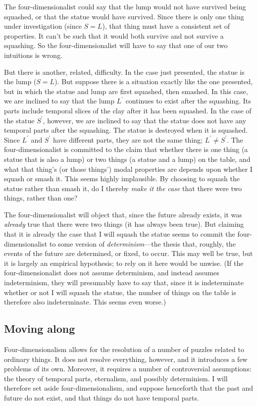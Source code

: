 \documentclass[11pt]{article}
\begin{document}
\begin{spacing}{1.5}
The four-dimensionalist could say that the lump would not have
survived being squashed, or that the statue would have survived.
Since there is only one thing under investigation (since $S = L$),
that thing must have a consistent set of properties.  It can't be such
that it would both survive and not survive a squashing.  So the
four-dimensionalist will have to say that one of our two intuitions is
wrong.

But there is another, related, difficulty.  In the case just
presented, the statue is the lump ($S = L$).  But suppose there is a
situation exactly like the one presented, but in which the statue and
lump are first squashed, then smashed.  In this case, we are inclined
to say that the lump $L^{\prime}$ continues to exist after the
squashing.  Its parts include temporal slices of the clay after it has
been squashed.  In the case of the statue $S^{\prime}$, however, we
are inclined to say that the statue does not have any temporal parts
after the squashing.  The statue is destroyed when it is squashed.
Since $L^{\prime}$ and $S^{\prime}$ have different parts, they are not
the same thing; $L^{\prime} \neq S^{\prime}$.  The four-dimensionalist
is committed to the claim that whether there is one thing (a statue
that is also a lump) or two things (a statue and a lump) on the table,
and what that thing's (or those things') modal properties are depends
upon whether I squash or smash it.  This seems highly implausible.  By
choosing to squash the statue rather than smash it, do I thereby {\em
  make it the case} that there were two things, rather than one?

The four-dimensionalist will object that, since the future already
exists, it was {\em already} true that there were two things (it has
always been true).  But claiming that it is already the case that I
will squash the statue seems to commit the four-dimensionalist to some
version of {\em determinism}---the thesis that, roughly, the events of
the future are determined, or fixed, to occur.  This may well be true,
but it is largely an empirical hypothesis; to rely on it here would be
unwise.  (If the four-dimensionalist does not assume determinism, and
instead assumes indeterminism, they will presumably have to say that,
since it is indeterminate whether or not I will squash the statue, the
number of things on the table is therefore also indeterminate.  This
seems even worse.)

\subsection{Moving along}
\label{4dc}
Four-dimensionalism allows for the resolution of a number of puzzles
related to ordinary things.  It does not resolve everything, however,
and it introduces a few problems of its own.  Moreover, it requires a
number of controversial assumptions: the theory of temporal parts,
eternalism, and possibly determinism.  I will therefore set aside
four-dimensionalism, and suppose henceforth that the past and future
do not exist, and that things do not have temporal parts.


\end{spacing}
\end{document}
